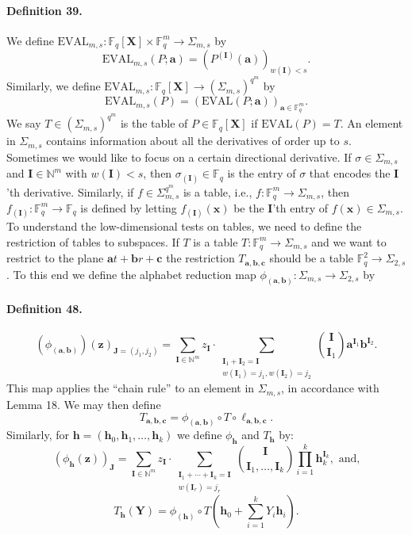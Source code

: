 \paragraph{Definition 39.} We define $\mathrm{EVAL}_{m,s}:\mathbb F_q[\boldsymbol X]\times\mathbb F_q^m\to\Sigma_{m,s}$ by
\[\mathrm{EVAL}_{m,s}(P;\boldsymbol a)=(P^{(\boldsymbol I)}(\boldsymbol a))_{w(\boldsymbol I)<s}.\]
Similarly, we define $\mathrm{EVAL}_{m,s}:\mathbb F_q[\boldsymbol X]\to(\Sigma_{m,s})^{q^m}$ by
\[\mathrm{EVAL}_{m,s}(P)=(\mathrm{EVAL}(P;\boldsymbol a))_{\boldsymbol a\in\mathbb F_q^m}.\]
We say $T\in(\Sigma_{m,s})^{q^m}$ is the table of $P\in\mathbb F_q[\boldsymbol X]$ if $\mathrm{EVAL}(P)=T$.
An element in $\Sigma_{m,s}$ contains information about all the derivatives of order up to $s$. Sometimes we would like to focus on a certain directional derivative. If $\sigma\in\Sigma_{m,s}$ and $\boldsymbol I\in\mathbb N^m$ with $w(\boldsymbol I)<s$, then $\sigma_{(\boldsymbol I)}\in\mathbb F_q$ is the entry of $\sigma$ that encodes the $\boldsymbol I$'th derivative. Similarly, if $f\in\Sigma_{m,s}^{q^m}$ is a table, i.e., $f:\mathbb F_q^m\to\Sigma_{m,s}$, then $f_{(\boldsymbol I)}:\mathbb F_q^m\to\mathbb F_q$ is defined by letting $f_{(\boldsymbol I)}(\boldsymbol x)$ be the $\boldsymbol I$'th entry of $f(\boldsymbol x)\in\Sigma_{m,s}$.
To understand the low-dimensional tests on tables, we need to define the restriction of tables to subspaces. If $T$ is a table $T:\mathbb F_q^m\to\Sigma_{m,s}$ and we want to restrict to the plane $\boldsymbol a t+\boldsymbol b r+\boldsymbol c$ the restriction $T_{\boldsymbol a,\boldsymbol b,\boldsymbol c}$ should be a table $\mathbb F_q^2\to\Sigma_{2,s}$. To this end we define the alphabet reduction map $\phi_{(\boldsymbol a,\boldsymbol b)}:\Sigma_{m,s}\to\Sigma_{2,s}$ by
\paragraph{Definition 48.}
\[(\phi_{(\boldsymbol a,\boldsymbol b)})(\boldsymbol z)_{\boldsymbol J=(j_1,j_2)}=\sum_{\boldsymbol I\in\mathbb N^m}z_{\boldsymbol I}\cdot\sum_{\substack{\boldsymbol I_1+\boldsymbol I_2=\boldsymbol I\\w(\boldsymbol I_1)=j_1,w(\boldsymbol I_2)=j_2}}\binom{\boldsymbol I}{\boldsymbol I_1}\boldsymbol a^{\boldsymbol I_1}\boldsymbol b^{\boldsymbol I_2}.\]
This map applies the ``chain rule'' to an element in $\Sigma_{m,s}$, in accordance with Lemma 18. We may then define
\[T_{\boldsymbol a,\boldsymbol b,\boldsymbol c}=\phi_{(\boldsymbol a,\boldsymbol b)}\circ T\circ\ell_{\boldsymbol a,\boldsymbol b,\boldsymbol c}.\]
Similarly, for $\boldsymbol h=(\boldsymbol h_0,\boldsymbol h_1,\ldots,\boldsymbol h_k)$ we define $\phi_{\boldsymbol h}$ and $T_{\boldsymbol h}$ by:
\[(\phi_{\boldsymbol h}(\boldsymbol z))_{\boldsymbol J}=\sum_{\boldsymbol I\in\mathbb N^m}z_{\boldsymbol I}\cdot\sum_{\substack{\boldsymbol I_1+\cdots+\boldsymbol I_k=\boldsymbol I\\w(\boldsymbol I_r)=j_r}}\binom{\boldsymbol I}{\boldsymbol I_1,\ldots,\boldsymbol I_k}\prod_{i=1}^k\boldsymbol h_k^{\boldsymbol I_k},\text{ and,}\]
\[T_{\boldsymbol h}(\boldsymbol Y)=\phi_{(\boldsymbol h)}\circ T\left(\boldsymbol h_0+\sum_{i=1}^kY_i\boldsymbol h_i\right).\]
